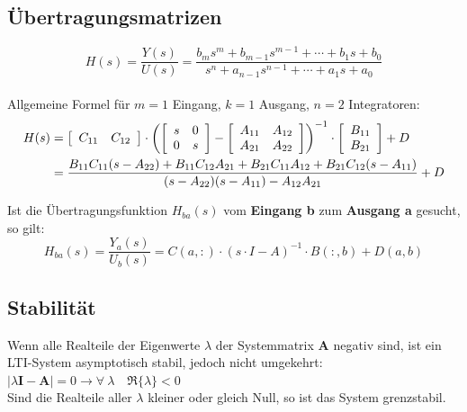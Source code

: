 \subsection{Übertragungsmatrizen }
\[
H(s)=\frac{Y(s)}{U(s)}=\frac{b_{m} s^{m} + b_{m-1} s^{m-1} +\cdots+b_{1} s 
+ b_{0}}{s^{n} + a_{n-1} s^{n-1} + \cdots + a_{1} s + a_{0}}
\]\\
Allgemeine Formel für $m=1$ Eingang, $k=1$ Ausgang, $n=2$ Integratoren:
\begin{align*}
H(s) &= \left[
	\begin{array}{c c}
		C_{11}  & C_{12}\\
	\end{array}
	\right] \cdot \left( \left[
	\begin{array}{cc}
		s & 0\\
		0 & s\\
	\end{array}
	\right] - \left[
	\begin{array}{cc}
		A_{11} & A_{12}\\
		A_{21} & A_{22}\\
	\end{array}
	\right] \right)^{-1} \cdot \left[
	\begin{array}{c}
		B_{11}\\
		B_{21}\\
	\end{array}
	\right ]+ D \\
	&=  \frac{B_{11}C_{11}(s-A_{22}) + B_{11}C_{12}A_{21} + B_{21}C_{11}A_{12} + B_{21}C_{12}(s-A_{11})}
		{(s-A_{22})(s-A_{11}) - A_{12}A_{21}} + D
\end{align*}
		
Ist die Übertragungsfunktion $H_{ba}(s)$ vom \textbf{Eingang b} zum \textbf{Ausgang a} gesucht, so gilt:
\[
  H_{ba}(s) = \frac{Y_a(s)}{U_b(s)} = C(a,:) \cdot (s \cdot I -A)^{-1} \cdot B(:,b) + D(a,b)
\]


\subsection{Stabilität }
Wenn alle Realteile der Eigenwerte $\lambda$ der Systemmatrix ${\boldsymbol A}$
negativ sind, ist ein LTI-System asymptotisch stabil, jedoch nicht umgekehrt:
$\left | \lambda\boldsymbol{I} - \boldsymbol{A} \right |   =0 \rightarrow \forall~\lambda \quad\Re \{\lambda\}<0$ \\
Sind die Realteile aller $\lambda$ kleiner oder gleich Null, so ist das System grenzstabil.

